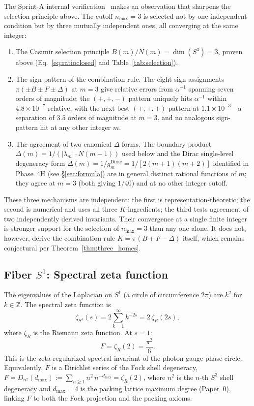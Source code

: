 \documentclass[aps,prl,twocolumn,superscriptaddress]{revtex4-2}
\begin{document}
The Sprint-A internal verification~\cite{alpha_sprint_a_memo} makes an
observation that sharpens the selection principle above. The cutoff
$n_{\max} = 3$ is selected not by one independent condition but by
three mutually independent ones, all converging at the same integer:
\begin{enumerate}
  \item The Casimir selection principle
    $B(m)/N(m) = \dim(S^3) = 3$, proven above
    (Eq.~\ref{eq:ratioclosed} and Table~\ref{tab:selection}).
  \item The sign pattern of the combination rule. The eight sign
    assignments $\pi(\pm B \pm F \pm \Delta)$ at $m = 3$ give
    relative errors from $\alpha^{-1}$ spanning seven orders of
    magnitude; the $(+,+,-)$ pattern uniquely hits $\alpha^{-1}$
    within $4.8 \times 10^{-7}$ relative, with the next-best
    $(+,+,+)$ pattern at $1.1 \times 10^{-3}$---a separation of
    $3.5$ orders of magnitude at $m = 3$, and no analogous
    sign-pattern hit at any other integer $m$.
  \item The agreement of two canonical $\Delta$ forms. The boundary
    product $\Delta(m) = 1/(|\lambda_m| \cdot N(m-1))$ used below
    and the Dirac single-level degeneracy form
    $\Delta(m) = 1/g_m^{\mathrm{Dirac}} = 1/[2(m+1)(m+2)]$ identified
    in Phase~4H (see \S\ref{sec:formula}) are in general distinct
    rational functions of $m$; they agree at $m = 3$ (both giving
    $1/40$) and at no other integer cutoff.
\end{enumerate}

These three mechanisms are independent: the first is
representation-theoretic; the second is numerical and uses all three
$K$-ingredients; the third tests agreement of two independently derived
invariants. Their convergence at a single finite integer is stronger
support for the selection of $n_{\max} = 3$ than any one alone. It
does not, however, derive the combination rule
$K = \pi(B + F - \Delta)$ itself, which remains conjectural per
Theorem~\ref{thm:three_homes}.


\subsection{Fiber $S^1$: Spectral zeta function}

The eigenvalues of the Laplacian on $S^1$ (a circle of circumference
$2\pi$) are $k^2$ for $k \in \mathbb{Z}$. The spectral zeta function
is
\begin{equation}
  \zeta_{S^1}(s) = 2\sum_{k=1}^{\infty} k^{-2s}
                 = 2\,\zeta_R(2s),
\end{equation}
where $\zeta_R$ is the Riemann zeta function. At $s = 1$:
\begin{equation}\label{eq:fiber}
  F = \zeta_R(2) = \frac{\pi^2}{6}.
\end{equation}
This is the zeta-regularized spectral invariant of the photon gauge
phase circle. Equivalently, $F$ is a Dirichlet series of the Fock
shell degeneracy,
$F = D_{n^2}(d_{\max}) := \sum_{n\geq 1} n^2\, n^{-d_{\max}} =
\zeta_R(2)$, where $n^2$ is the $n$-th $S^3$ shell degeneracy and
$d_{\max}=4$ is the packing lattice maximum degree (Paper~0),
linking $F$ to both the Fock projection and the packing axioms.
\end{document}
